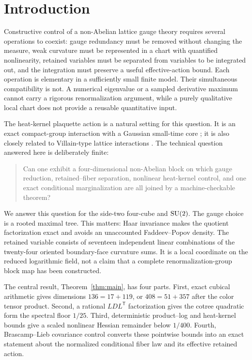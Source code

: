 \section{Introduction}\label{sec:introduction}

Constructive control of a non-Abelian lattice gauge theory requires several
operations to coexist: gauge redundancy must be removed without changing the
measure, weak curvature must be represented in a chart with quantified
nonlinearity, retained variables must be separated from variables to be
integrated out, and the integration must preserve a useful effective-action
bound.  Each operation is elementary in a sufficiently small finite model.
Their simultaneous compatibility is not.  A numerical eigenvalue or a sampled
derivative maximum cannot carry a rigorous renormalization argument, while a
purely qualitative local chart does not provide a reusable quantitative input.

The heat-kernel plaquette action is a natural setting for this question.  It is
an exact compact-group interaction with a Gaussian small-time core
\cite{MenottiOnofri1981}; it is also closely related to Villain-type lattice
interactions \cite{ChevyrevGarban2025}.  The technical question answered here
is deliberately finite:

\begin{quote}
Can one exhibit a four-dimensional non-Abelian block on which gauge reduction,
retained--fiber separation, nonlinear heat-kernel control, and one exact
conditional marginalization are all joined by a machine-checkable theorem?
\end{quote}

We answer this question for the side-two four-cube and $\mathrm{SU}(2)$.  The gauge
choice is a rooted maximal tree.  This matters: Haar invariance makes the
quotient factorization exact and avoids an unaccounted Faddeev--Popov density.
The retained variable consists of seventeen independent linear combinations
of the twenty-four oriented boundary-face curvature sums.  It is a local
coordinate on the reduced logarithmic field, not a claim that a complete
renormalization-group block map has been constructed.

The central result, Theorem~\ref{thm:main}, has four parts.  First, exact
cubical arithmetic gives dimensions $136=17+119$, or $408=51+357$ after the
color tensor product.  Second, a rational $LDL^{\mathsf T}$ factorization gives
the cotree quadratic form the spectral floor $1/25$.  Third, deterministic
product--log and heat-kernel bounds give a scaled nonlinear Hessian remainder
below $1/400$.  Fourth, Brascamp--Lieb covariance control converts these
pointwise bounds into an exact statement about the normalized conditional
fiber law and its effective retained action.

